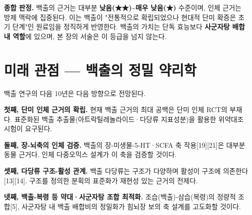 \documentclass[11pt,oneside]{book}
\begin{document}
\vspace{2pt}\vspace{3pt}

\textbf{종합 판정.} 백출의 근거는 대부분 \textbf{낮음(★★)\textasciitilde{}매우 낮음(★)} 수준이며, 인체 근거는 방제 맥락에 집중된다. 이는 백출이 "전통적으로 확립되었으나 현대적 단미 확증은 초기 단계"인 원료임을 정직하게 반영한다. 백출의 가치는 단독 효능보다 \textbf{사군자탕 배합 내 역할}에 있으며, 본 장의 서술은 이 등급을 넘지 않는다.

\section{미래 관점 — 백출의 정밀 약리학}
백출 연구의 다음 10년은 다음 방향으로 전망된다.

\textbf{첫째, 단미 인체 근거의 확립.} 현재 백출 근거의 최대 공백은 단미 인체 RCT의 부재다. 표준화된 백출 추출물(아트락틸레놀라이드·다당류 지표성분)을 활용한 위약대조 시험이 요구된다.

\textbf{둘째, 장-뇌축의 인체 검증.} 백출의 장-미생물-5-HT·SCFA 축 작용[19][21]은 대부분 동물 근거다. 인체 다중오믹스 설계가 이 축을 검증할 것이다.

\textbf{셋째, 다당류 구조-활성 관계.} 백출 다당류는 구조가 다양하며 활성이 구조에 의존한다[13][14]. 구조를 정의한 분획의 표준화가 재현성 있는 근거의 전제다.

\textbf{넷째, 백출-복령 등 약대·사군자탕 조합 최적화.} 조습(백출)-삼습(복령)의 정량적 조합[5], 사군자탕 내 백출 배합비의 정밀화가 힘뇌장 보의 축 설계를 고도화할 것이다.
\end{document}
